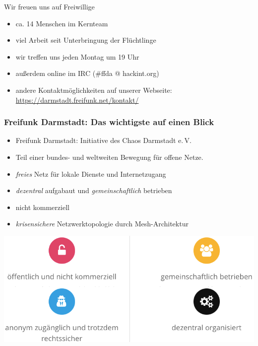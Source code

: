 \documentclass[10pt]{beamer}
\begin{document}
\begin{frame}{Wir freuen uns auf Freiwillige}
	\begin{itemize}
		\item ca. 14 Menschen im Kernteam	
		\item viel Arbeit seit Unterbringung der Flüchtlinge
		\vfill
		\pause
		\item wir treffen uns jeden Montag um 19 Uhr
		\item außerdem online im IRC (\#ffda @ hackint.org)
		\item andere Kontaktmöglichkeiten auf unserer Webseite:\\
		\url{https://darmstadt.freifunk.net/kontakt/}
	\end{itemize}
\end{frame}

\begin{frame}
	\frametitle{Freifunk Darmstadt: Das wichtigste auf einen Blick}
	\begin{centering}
	\begin{itemize}
		\item Freifunk Darmstadt: Initiative des Chaos Darmstadt e.\,V.
		\item Teil einer bundes- und weltweiten Bewegung für offene Netze.
		\item \emph{freies} Netz für lokale Dienste und Internetzugang
		\item \emph{dezentral} aufgabaut und \emph{gemeinschaftlich} betrieben
		\item nicht kommerziell %
		\item \emph{krisensichere} Netzwerktopologie durch Mesh-Architektur
	\end{itemize}
	\includegraphics[width=1.0\textheight]{images/principles}$\;$
	\end{centering}


\end{frame}
\end{document}
